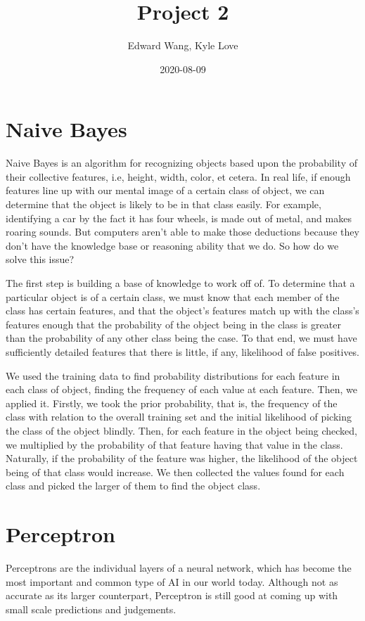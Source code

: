 \documentclass{article}
\title{Project 2}
\date{2020-08-09}
\author{Edward Wang, Kyle Love}
\begin{document}
\maketitle

\section{Naive Bayes}
Naive Bayes is an algorithm for recognizing objects based upon the probability of their collective features, i.e, height, width, color, et cetera. In real life, if enough features line up with our mental image of a certain class of object, we can determine that the object is likely to be in that class easily. For example, identifying a car by the fact it has four wheels, is made out of metal, and makes roaring sounds. But computers aren't able to make those deductions because they don't have the knowledge base or reasoning ability that we do. So how do we solve this issue?
\par
The first step is building a base of knowledge to work off of. To determine that a particular object is of a certain class, we must know that each member of the class has certain features, and that the object's features match up with the class's features enough that the probability of the object being in the class is greater than the probability of any other class being the case. To that end, we must have sufficiently detailed features that there is little, if any, likelihood of false positives.
\par
We used the training data to find probability distributions for each feature in each class of object, finding the frequency of each value at each feature. Then, we applied it. Firstly, we took the prior probability, that is, the frequency of the class with relation to the overall training set and the initial likelihood of picking the class of the object blindly. Then, for each feature in the object being checked, we multiplied by the probability of that feature having that value in the class. Naturally, if the probability of the feature was higher, the likelihood of the object being of that class would increase. We then collected the values found for each class and picked the larger of them to find the object class.
\section{Perceptron}
Perceptrons are the individual layers of a neural network, which has become the most important and common type of AI in our world today. Although not as accurate as its larger counterpart, Perceptron is still good at coming up with small scale predictions and judgements.
\end{document}
